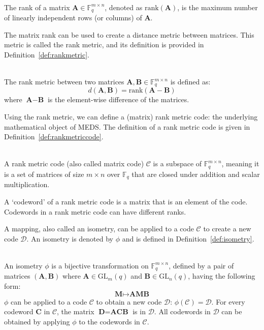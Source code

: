 \documentclass[11pt,a4paper]{report}
\theoremstyle{definition}
\begin{document}
\begin{definition}~\\
  \label{def:matrixrank}
  The rank of a matrix $\textbf{A} \in \mathbb{F}_q^{m \times n}$, denoted as $\text{rank}(\textbf{A})$, is the maximum number of linearly independent rows (or columns) of $\textbf{A}$.
\end{definition}

The matrix rank can be used to create a distance metric between matrices. This metric is called the rank metric, and its definition is provided in Definition~\ref{def:rankmetric}.

\begin{definition}~\\
  \label{def:rankmetric}
  The rank metric between two matrices $\textbf{A}, \textbf{B} \in \mathbb{F}_q^{m \times n}$ is defined as:
  \[
    d(\textbf{A}, \textbf{B}) = \text{rank}(\textbf{A} - \textbf{B})
  \]
  where $\textbf{A} - \textbf{B}$ is the element-wise difference of the matrices.
\end{definition}

Using the rank metric, we can define a (matrix) rank metric code: the underlying mathematical object of MEDS. The definition of a rank metric code is given in Definition~\ref{def:rankmetriccode}.

\begin{definition}~\\
  \label{def:rankmetriccode}
  A rank metric code (also called matrix code) $\mathcal{C}$ is a subspace of $\mathbb{F}_q^{m \times n}$, meaning it is a set of matrices of size $m \times n$ over $\mathbb{F}_q$ that are closed under addition and scalar multiplication.
\end{definition}

A `codeword' of a rank metric code is a matrix that is an element of the code. Codewords in a rank metric code can have different ranks.

A mapping, also called an isometry, can be applied to a code $\mathcal{C}$ to create a new code $\mathcal{D}$. An isometry is denoted by $\phi$ and is defined in Definition~\ref{def:isometry}.

\begin{definition}~\\
  \label{def:isometry}
  An isometry $\phi$ is a bijective transformation on $\mathbb{F}_q^{m \times n}$, defined by a pair of matrices $(\textbf{A}, \textbf{B})$ where $\textbf{A} \in \text{GL}_m(q)$ and $\textbf{B} \in \text{GL}_n(q)$, having the following form:
  \[
    \textbf{M} \mapsto \textbf{A} \textbf{M} \textbf{B}
  \]
  $\phi$ can be applied to a code $\mathcal{C}$ to obtain a new code $\mathcal{D}$: $\phi(\mathcal{C}) = \mathcal{D}$. For every codeword $\textbf{C}$ in $\mathcal{C}$, the matrix $\textbf{D} = \textbf{A} \textbf{C} \textbf{B}$ is in $\mathcal{D}$. All codewords in $\mathcal{D}$ can be obtained by applying $\phi$ to the codewords in $\mathcal{C}$.
\end{definition}
\end{document}
